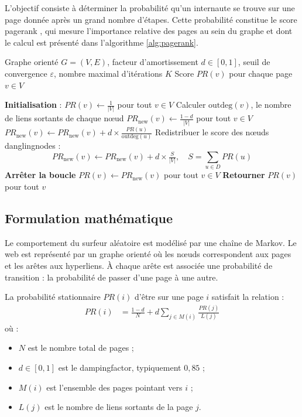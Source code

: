 \documentclass[conference]{IEEEtran}
\begin{document}
L'objectif consiste à déterminer la probabilité qu'un internaute se trouve sur une page donnée après un grand nombre d'étapes. Cette probabilité constitue le \og score \gls{pagerank} \fg{}, qui mesure l'importance relative des pages au sein du graphe et dont le calcul est présenté dans l'algorithme \ref{alg:pagerank}.

\begin{algorithm}[H]
\caption{Calcul du PageRank avec facteur d'amortissement}
\label{alg:pagerank}
\begin{algorithmic}[1]
\Require Graphe orienté $G = (V, E)$, facteur d'amortissement $d \in [0,1]$, seuil de convergence $\varepsilon$, nombre maximal d'itérations $K$
\Ensure Score $PR(v)$ pour chaque page $v \in V$
\Statex

\State \textbf{Initialisation} : $PR(v) \gets \tfrac{1}{|V|}$ pour tout $v \in V$
\State Calculer $\text{outdeg}(v)$, le nombre de liens sortants de chaque nœud
    \State $PR_{\text{new}}(v) \gets \tfrac{1 - d}{|V|}$ pour tout $v \in V$
        \State $PR_{\text{new}}(v) \gets PR_{\text{new}}(v) + d \times \tfrac{PR(u)}{\text{outdeg}(u)}$
    \EndFor
    \State Redistribuer le score des nœuds \glspl{danglingnode} :
    \[
    PR_{\text{new}}(v) \gets PR_{\text{new}}(v) + d \times \tfrac{S}{|V|}, 
    \quad S = \sum_{u \in D} PR(u)
    \]
        \State \textbf{Arrêter la boucle}
    \EndIf
    \State $PR(v) \gets PR_{\text{new}}(v)$ pour tout $v \in V$
\EndFor
\State \textbf{Retourner} $PR(v)$ pour tout $v$
\end{algorithmic}
\end{algorithm}

\subsection{Formulation mathématique}

Le comportement du surfeur aléatoire est modélisé par une chaîne de Markov.
Le web est représenté par un graphe orienté où les nœuds correspondent aux pages et les arêtes aux hyperliens.  
À chaque arête est associée une probabilité de transition : la probabilité de passer d'une page à une autre.  

La probabilité stationnaire $PR(i)$ d'être sur une page $i$ satisfait la relation :
\begin{align}
    PR(i) &= \frac{1 - d}{N} + d \sum_{j \in M(i)} \frac{PR(j)}{L(j)}
    \label{eq:pagerank-classique}
\end{align}
où :
\begin{itemize}
    \item $N$ est le nombre total de pages ;
    \item $d \in [0,1]$ est le \gls{dampingfactor}, typiquement $0{,}85$ ;
    \item $M(i)$ est l'ensemble des pages pointant vers $i$ ;
    \item $L(j)$ est le nombre de liens sortants de la page $j$.
\end{itemize}
\end{document}

